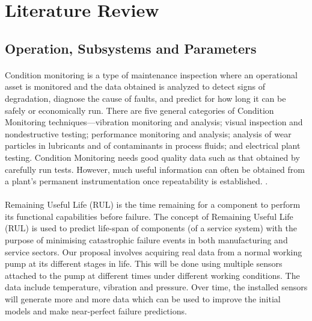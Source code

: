 \section{Literature Review}
\subsection{ Operation, Subsystems and Parameters}
\paragraph{}Condition monitoring is a type of maintenance inspection where an operational asset is monitored and the data obtained is analyzed to detect signs of degradation, diagnose the cause of faults, and predict for how long it can be safely or economically run. There are five general categories of Condition Monitoring techniques—vibration monitoring and analysis; visual inspection and nondestructive testing; performance monitoring and analysis; analysis of wear particles in lubricants and of contaminants in process fluids; and electrical plant testing.  Condition Monitoring needs good quality data such as that obtained by carefully run tests. However, much useful information can often be obtained from a plant's permanent instrumentation once repeatability is established.
\cite{thanapalan_model_2011}.

\paragraph{}Remaining Useful Life (RUL) is the time remaining for a component to perform its functional capabilities before failure.
The concept of Remaining Useful Life (RUL) is used to predict life-span of components (of a service system) with the purpose of minimising catastrophic failure events in both manufacturing and service sectors. Our proposal involves acquiring real data from a normal working pump at its different stages in life. This will be done using multiple sensors attached to the pump at different times under different working conditions. The data include temperature, vibration and pressure.
Over time, the installed sensors will generate more and more data which can be used to improve the initial models and make near-perfect failure predictions.


